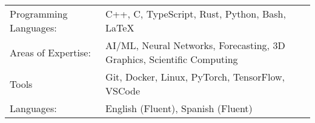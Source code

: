 \vspace{2mm}

\begin{tabular}{p{4cm}p{12cm}}
Programming Languages: & C++, C, TypeScript, Rust, Python, Bash, LaTeX \\
Areas of Expertise: & AI/ML, Neural Networks, Forecasting, 3D Graphics, Scientific Computing \\
Tools & Git, Docker, Linux, PyTorch, TensorFlow, VSCode \\
Languages: & English (Fluent), Spanish (Fluent) 
\end{tabular}
\vspace{1mm}


